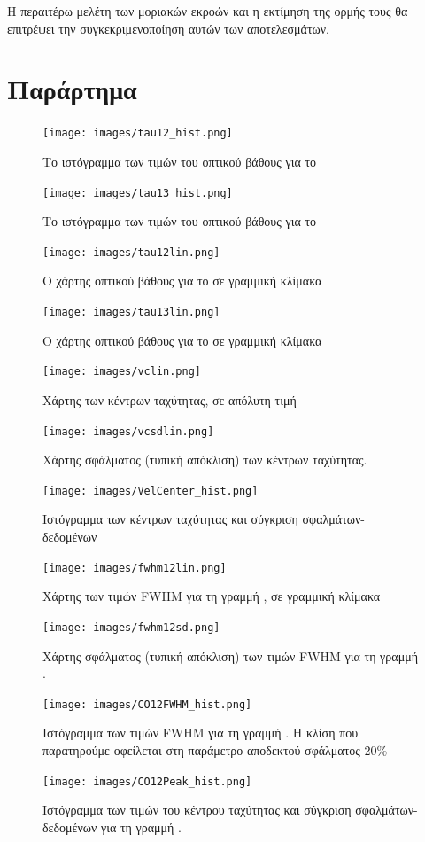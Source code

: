 \documentclass[a4paper,12pt]{memoir}
\begin{document}
 Η περαιτέρω μελέτη των μοριακών εκροών και η εκτίμηση της ορμής τους  θα επιτρέψει την συγκεκριμενοποίηση αυτών των αποτελεσμάτων.

\chapter*{Παράρτημα}

\begin{figure}[h]
	\centering
	\texttt{[image: images/tau12\_hist.png]}
	\caption{Το ιστόγραμμα των τιμών του οπτικού βάθους για το }
	\centering
	\texttt{[image: images/tau13\_hist.png]}
	\caption{Το ιστόγραμμα των τιμών του οπτικού βάθους για το }
\end{figure}

\begin{figure}[h]
	\centering
	\texttt{[image: images/tau12lin.png]}
	\caption{Ο χάρτης οπτικού βάθους για το  σε γραμμική κλίμακα}
	\centering
	\texttt{[image: images/tau13lin.png]}
	\caption{Ο χάρτης οπτικού βάθους για το  σε γραμμική κλίμακα}
\end{figure}



\begin{figure}[h]
	\centering
	\texttt{[image: images/vclin.png]}
	\caption{Χάρτης των κέντρων ταχύτητας, σε απόλυτη τιμή}
	
	\centering
	\texttt{[image: images/vcsdlin.png]}
	\caption{Χάρτης σφάλματος (τυπική απόκλιση) των κέντρων ταχύτητας.}
\end{figure}

\begin{figure}[h]
	\centering
	\texttt{[image: images/VelCenter\_hist.png]}
	\caption{Ιστόγραμμα των κέντρων ταχύτητας και σύγκριση σφαλμάτων-δεδομένων}
\end{figure}


\begin{figure}[h]
	\centering
	\texttt{[image: images/fwhm12lin.png]}
	\caption{Χάρτης των τιμών FWHM για τη γραμμή , σε γραμμική κλίμακα}
	
	\centering
	\texttt{[image: images/fwhm12sd.png]}
	\caption{Χάρτης σφάλματος (τυπική απόκλιση) των τιμών FWHM για τη γραμμή .}
\end{figure}

\begin{figure}[h]
	\centering
	\texttt{[image: images/CO12FWHM\_hist.png]}
	\caption{Ιστόγραμμα των τιμών FWHM για τη γραμμή . Η κλίση που παρατηρούμε οφείλεται στη παράμετρο αποδεκτού σφάλματος 20\%}
	
	\centering
	\texttt{[image: images/CO12Peak\_hist.png]}
	\caption{Ιστόγραμμα των τιμών του κέντρου ταχύτητας και σύγκριση σφαλμάτων-δεδομένων για τη γραμμή .}
\end{figure}
\end{document}
